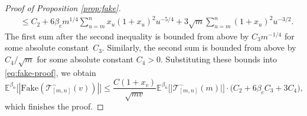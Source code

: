 \documentclass[a4paper, a4wide, 10pt, reqno]{amsart}
\theoremstyle{plain}
\theoremstyle{definition}
\numberwithin{equation}{section}
\newcommand{\E}{\mathbb E}
\newcommand{\sT}{{\mathscr T}}
\begin{document}
\begin{proof}[Proof of Proposition \ref{prop:fake}]
\[\begin{aligned}
    &\le C_2 + 6\beta_cm^{1/4}\sum_{u=m}^nx_u(1+x_u)^2u^{-5/4} +3\sqrt{m}\sum_{u=m}^n (1+x_u)^2u^{-3/2}.
    \end{aligned}
    \]
    The first sum after the second inequality is bounded from above by $C_3m^{-1/4}$ for some absolute constant~$C_3$.
    Similarly, the second sum is bounded from above by $C_4/\sqrt{m}$ for some absolute constant $C_4>0$.  Substituting these bounds into \eqref{eq:fake-proof}, we obtain 
    \begin{equation*}
    \E^{\beta_n}\big[|\mathrm{Fake}(\sT_{[m,n]}^-(v))|\big]
        \le \frac{C(1+x_v)}{\sqrt{mv}}\E^{\beta_n}\big[\big|\sT^-_{[m,n]}(m)\big|\big]\cdot \big(C_2 + 6\beta_cC_3 + 3C_4\big), 
    \end{equation*}
    which finishes the proof.
\end{proof}
\end{document}
